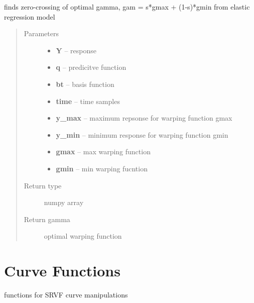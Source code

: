\documentclass[letterpaper,10pt,english]{sphinxmanual}
\begin{document}
\begin{fulllineitems}
\label{utility_functions:utility_functions.zero_crossing}
finds zero-crossing of optimal gamma, gam = s*gmax + (1-s)*gmin
from elastic regression model
\begin{quote}\begin{description}
\item[{Parameters}] \leavevmode\begin{itemize}
\item {} 
\textbf{Y} -- response

\item {} 
\textbf{q} -- predicitve function

\item {} 
\textbf{bt} -- basis function

\item {} 
\textbf{time} -- time samples

\item {} 
\textbf{y\_max} -- maximum repsonse for warping function gmax

\item {} 
\textbf{y\_min} -- minimum response for warping function gmin

\item {} 
\textbf{gmax} -- max warping function

\item {} 
\textbf{gmin} -- min warping fucntion

\end{itemize}

\item[{Return type}] \leavevmode
numpy array

\item[{Return gamma}] \leavevmode
optimal warping function

\end{description}\end{quote}

\end{fulllineitems}



\chapter{Curve Functions}
\label{curve_functions:curve-functions}\label{curve_functions:module-curve_functions}\label{curve_functions::doc}
functions for SRVF curve manipulations
\end{document}
